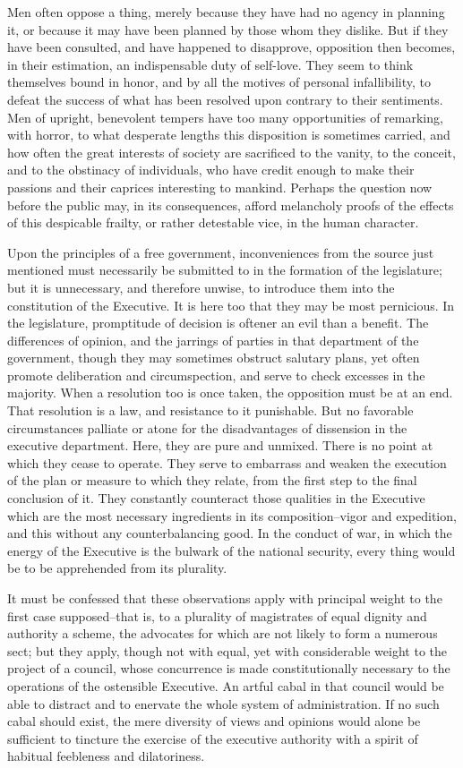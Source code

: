 Men often oppose a thing, merely because they have had no agency in planning it, or because it may have been planned by those whom they dislike. 
But if they have been consulted, and have happened to disapprove, opposition then becomes, in their estimation, an indispensable duty of self-love. 
They seem to think themselves bound in honor, and by all the motives of personal infallibility, to defeat the success of what has been resolved upon contrary to their sentiments. 
Men of upright, benevolent tempers have too many opportunities of remarking, with horror, to what desperate lengths this disposition is sometimes carried, and how often the great interests of society are sacrificed to the vanity, to the conceit, and to the obstinacy of individuals, who have credit enough to make their passions and their caprices interesting to mankind. 
Perhaps the question now before the public may, in its consequences, afford melancholy proofs of the effects of this despicable frailty, or rather detestable vice, in the human character.

Upon the principles of a free government, inconveniences from the source just mentioned must necessarily be submitted to in the formation of the legislature; but it is unnecessary, and therefore unwise, to introduce them into the constitution of the Executive. 
It is here too that they may be most pernicious. 
In the legislature, promptitude of decision is oftener an evil than a benefit. 
The differences of opinion, and the jarrings of parties in that department of the government, though they may sometimes obstruct salutary plans, yet often promote deliberation and circumspection, and serve to check excesses in the majority. 
When a resolution too is once taken, the opposition must be at an end. 
That resolution is a law, and resistance to it punishable. 
But no favorable circumstances palliate or atone for the disadvantages of dissension in the executive department. 
Here, they are pure and unmixed. 
There is no point at which they cease to operate. 
They serve to embarrass and weaken the execution of the plan or measure to which they relate, from the first step to the final conclusion of it. 
They constantly counteract those qualities in the Executive which are the most necessary ingredients in its composition--vigor and expedition, and this without any counterbalancing good. 
In the conduct of war, in which the energy of the Executive is the bulwark of the national security, every thing would be to be apprehended from its plurality.

It must be confessed that these observations apply with principal weight to the first case supposed--that is, to a plurality of magistrates of equal dignity and authority a scheme, the advocates for which are not likely to form a numerous sect; but they apply, though not with equal, yet with considerable weight to the project of a council, whose concurrence is made constitutionally necessary to the operations of the ostensible Executive. 
An artful cabal in that council would be able to distract and to enervate the whole system of administration. 
If no such cabal should exist, the mere diversity of views and opinions would alone be sufficient to tincture the exercise of the executive authority with a spirit of habitual feebleness and dilatoriness.

